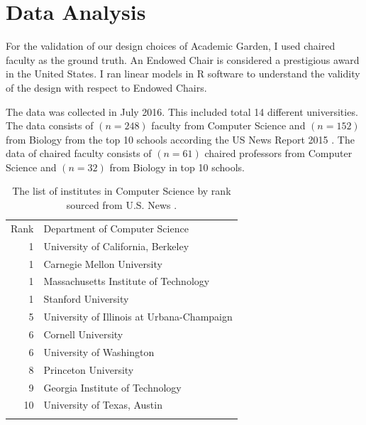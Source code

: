 \section{Data Analysis}
For the validation of our design choices of Academic Garden, I used chaired faculty as the ground truth. An Endowed Chair is considered a prestigious award in the United States. I ran linear models in R software \cite{R:The81:online} to understand the validity of the design with respect to Endowed Chairs. 

The data was collected in July 2016. This included total 14 different universities. The data consists of $( n = 248 )$ faculty from Computer Science and $( n = 152 )$ from Biology from the top 10 schools according the US News Report 2015 \cite{usnews}. The data of chaired faculty consists of $( n = 61 )$ chaired professors from Computer Science and  $( n = 32 )$ from Biology in top 10 schools.


\begin{table}
\centering
\caption{The list of institutes in Computer Science by rank sourced from U.S. News \cite{usnews}.}
\label{tab:1}       %
\begin{tabular}{rl}
\hline\noalign{\smallskip}
Rank & Department of Computer Science \\
\noalign{\smallskip}\hline\noalign{\smallskip}
1 & University of California, Berkeley \\
1 & Carnegie Mellon University \\
1 & Massachusetts Institute of Technology \\
1 & Stanford University \\
5 & University of Illinois at Urbana-Champaign \\
6 & Cornell University \\
6 & University of Washington \\
8 & Princeton University \\
9 & Georgia Institute of Technology \\
10 & University of Texas, Austin  \\
\noalign{\smallskip}\hline
\end{tabular}
\end{table}



